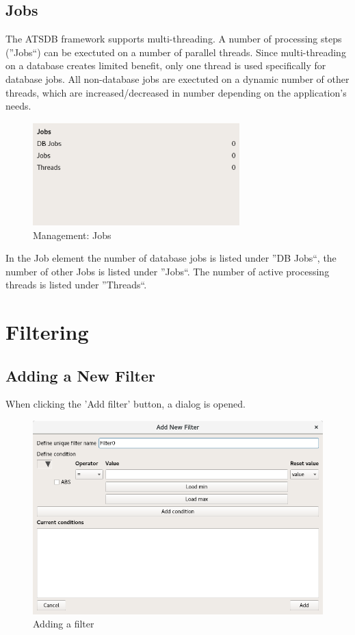 \documentclass[10pt,letterpaper,extrafontsizes]{memoir}
\begin{document}
\subsection{Jobs}

The ATSDB framework supports multi-threading. A number of processing steps (''Jobs``) can be exectuted on a number of parallel threads. Since multi-threading on a database creates limited benefit, only one thread is used specifically for database jobs. All non-database jobs are exectuted on a dynamic number of other threads, which are increased/decreased in number depending on the application's needs. 

\begin{figure}[H]
  \center
    \includegraphics[width=8cm]{../screenshots/management_jobs.png}
  \caption{Management: Jobs}
  \label{fig:management_jobs}
\end{figure}

In the Job element the number of database jobs is listed under ''DB Jobs``, the number of other Jobs is listed under ''Jobs``. The number of active processing threads is listed under ''Threads``.

\section{Filtering}
\label{sec:filtering}

\subsection{Adding a New Filter}
When clicking the 'Add filter' button, a dialog is opened.

\begin{figure}[H]
  \center
    \includegraphics[width=14cm]{../screenshots/filter_add.png}
  \caption{Adding a filter}
  \label{fig:filter_add}
\end{figure}
\end{document}
